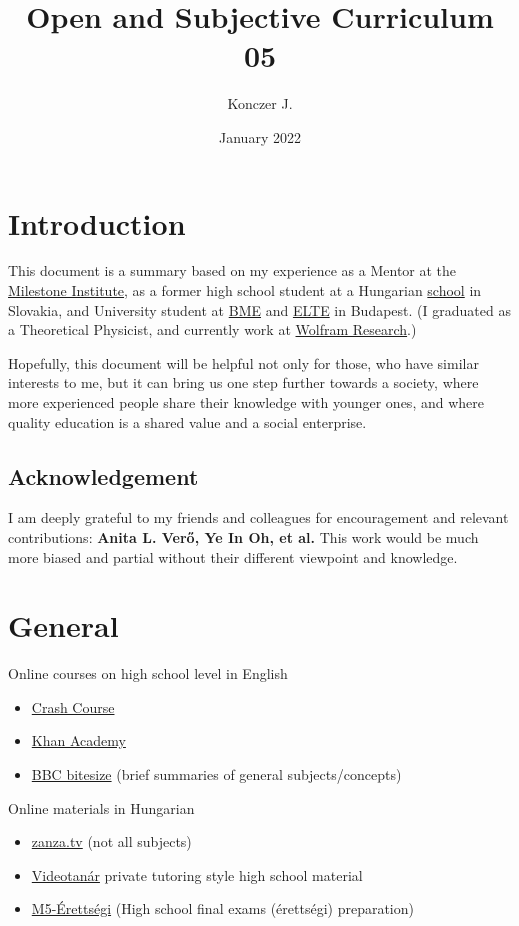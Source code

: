 \documentclass{article}
\title{Open and Subjective Curriculum \\ 05}
\author{Konczer J.}
\date{January 2022}
\begin{document}
\maketitle

\section*{}

\section{Introduction}

This document is a summary based on my experience as a Mentor at the \href{https://milestone-institute.org/}{Milestone Institute}, as a former high school student at a Hungarian \href{http://selye.gartproject.com/}{school} in Slovakia, and University student at \href{https://www.bme.hu/?language=en}{BME} and \href{https://www.elte.hu/en/}{ELTE} in Budapest.
(I graduated as a Theoretical Physicist, and currently work at \href{https://www.wolfram.com/}{Wolfram Research}.)

Hopefully, this document will be helpful not only for those, who have similar interests to me, but it can bring us one step further towards a society, where more experienced people share their knowledge with younger ones, and where quality education is a shared value and a social enterprise.

\subsection{Acknowledgement}

I am deeply grateful to my friends and colleagues for encouragement and relevant contributions:
{\bf
Anita L. Verő,
Ye In Oh,
et al.
}
This work would be much more biased and partial without their different viewpoint and knowledge.

\section{General}

Online courses on high school level in English
\begin{itemize}
\item \href{https://thecrashcourse.com/}{Crash Course}
\item \href{https://www.khanacademy.org/}{Khan Academy}
\item \href{https://www.bbc.co.uk/bitesize/levels/z98jmp3}{BBC bitesize} (brief summaries of general subjects/concepts)
\end{itemize}
Online materials in Hungarian
\begin{itemize}
    \item \href{https://zanza.tv/}{zanza.tv} (not all subjects)
    \item \href{https://www.youtube.com/user/videotanar/}{Videotanár} private tutoring style high school material
    \item \href{https://www.youtube.com/playlist?list=PLEiwVd6n_Q_38BxQQDqYZE6bdMQAZxbX2}{M5-Érettségi} (High school final exams (érettségi) preparation)
\end{itemize}
\end{document}
